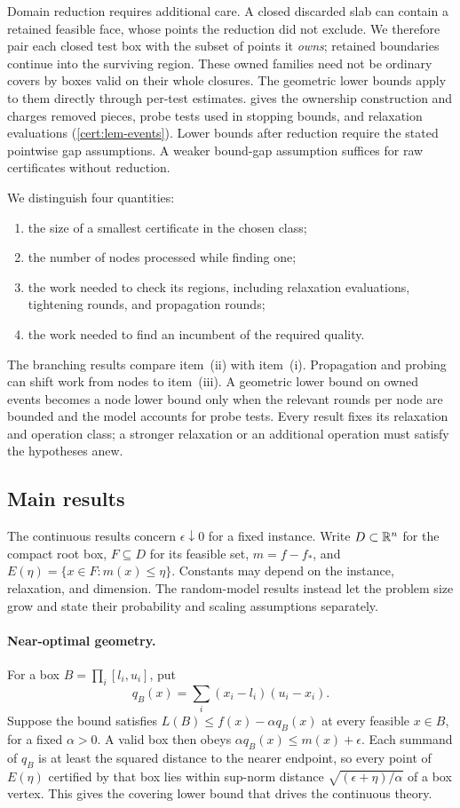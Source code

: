 Domain reduction requires additional care. A closed discarded slab can
contain a retained feasible face, whose points the reduction did not
exclude. We therefore pair each closed test box with the subset of points
it \emph{owns}; retained boundaries continue into the surviving region.
These owned families need not be ordinary covers by boxes valid on their
whole closures. The geometric lower bounds apply to them directly through
per-test estimates.  gives the ownership construction
and charges removed pieces, probe tests used in stopping bounds, and
relaxation evaluations (\cref{cert:lem-events}). Lower bounds after reduction require the stated
pointwise gap assumptions. A weaker bound-gap assumption suffices for raw
certificates without reduction.

We distinguish four quantities:
\begin{enumerate}[label=(\roman*)]
\item the size of a smallest certificate in the chosen class;
\item the number of nodes processed while finding one;
\item the work needed to check its regions, including relaxation evaluations,
  tightening rounds, and propagation rounds;
\item the work needed to find an incumbent of the required quality.
\end{enumerate}
The branching results compare item~(ii) with item~(i). Propagation and
probing can shift work from nodes to item~(iii). A geometric lower bound on
owned events becomes a node lower bound only when the relevant rounds per
node are bounded and the model accounts for probe tests. Every result fixes
its relaxation and operation class; a stronger relaxation or an additional
operation must satisfy the hypotheses anew.

\subsection{Main results}\label{intro:results}

The continuous results concern $\epsilon\downarrow0$ for a fixed instance.
Write $D\subset\mathbb{R}^n$ for the compact root box, $F\subseteq D$ for its
feasible set, $m=f-f_*$, and
$E(\eta)=\{x\in F:m(x)\leq\eta\}$. Constants may depend on the instance,
relaxation, and dimension. The random-model results instead let the problem
size grow and state their probability and scaling assumptions separately.

\paragraph{Near-optimal geometry.}
For a box $B=\prod_i[l_i,u_i]$, put
\[
 q_B(x)=\sum_i(x_i-l_i)(u_i-x_i).
\]
Suppose the bound satisfies $L(B)\leq f(x)-\alpha q_B(x)$ at every
feasible $x\in B$, for a fixed $\alpha>0$. A valid box then obeys
$\alpha q_B(x)\leq m(x)+\epsilon$. Each summand of $q_B$ is at least
the squared distance to the nearer endpoint, so every point of
$E(\eta)$ certified by that box lies within sup-norm distance
$\sqrt{(\epsilon+\eta)/\alpha}$ of a box vertex. This gives the
covering lower bound that drives the continuous theory.

